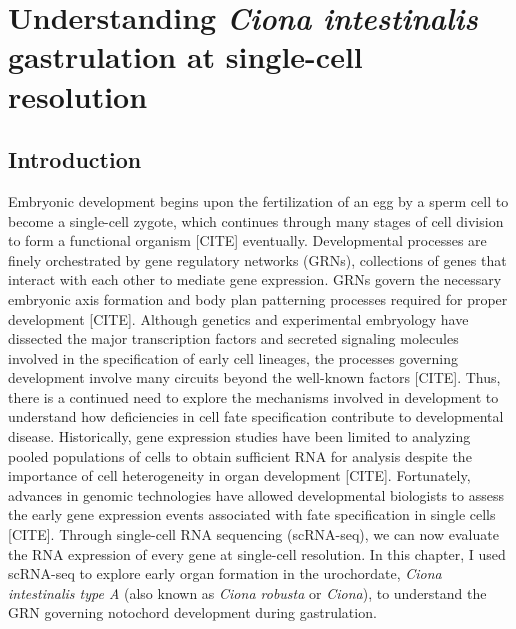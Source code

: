 \chapter{Understanding \textit{Ciona intestinalis} gastrulation at single-cell resolution}

\section{Introduction}

Embryonic development begins upon the fertilization of an egg by a sperm cell to become a single-cell zygote, which continues through many stages of cell division to form a functional organism [CITE] eventually. Developmental processes are finely orchestrated by gene regulatory networks (GRNs), collections of genes that interact with each other to mediate gene expression. GRNs govern the necessary embryonic axis formation and body plan patterning processes required for proper development [CITE]. Although genetics and experimental embryology have dissected the major transcription factors and secreted signaling molecules involved in the specification of early cell lineages, the processes governing development involve many circuits beyond the well-known factors [CITE]. Thus, there is a continued need to explore the mechanisms involved in development to understand how deficiencies in cell fate specification contribute to developmental disease. Historically, gene expression studies have been limited to analyzing pooled populations of cells to obtain sufficient RNA for analysis despite the importance of cell heterogeneity in organ development [CITE]. Fortunately, advances in genomic technologies have allowed developmental biologists to assess the early gene expression events associated with fate specification in single cells [CITE]. Through single-cell RNA sequencing (scRNA-seq), we can now evaluate the RNA expression of every gene at single-cell resolution. In this chapter, I used scRNA-seq to explore early organ formation in the urochordate, \textit{Ciona intestinalis type A} (also known as \textit{Ciona robusta} or \textit{Ciona}), to understand the GRN governing notochord development during gastrulation.

